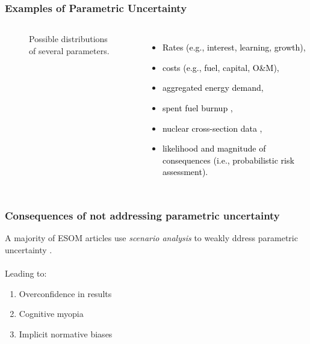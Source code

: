 \begin{frame}
    \frametitle{Examples of Parametric Uncertainty}

    \begin{columns}
        \column[t]{5cm}
        \begin{figure}
            \centering
            \resizebox{\columnwidth}{!}{
                
            }
            \caption{Possible distributions of several parameters.}
            \label{fig:multi-distributions}
        \end{figure}

        \column[t]{5cm}

        \begin{itemize}
            \item \textcolor{black}{Rates (e.g., interest, learning, growth),}
            \item \textcolor{black}{costs (e.g., fuel, capital, O\&M),}
            \item \textcolor{black}{aggregated energy demand,}
            \item \textcolor{black}{spent fuel burnup
            \cite{feng_sensitivity_2020},}
            \item \textcolor{black}{nuclear cross-section data
            \cite{eades_influence_2016,radaideh_combining_2019},}
            \item \textcolor{black}{likelihood and magnitude of consequences
            (i.e., probabilistic risk assessment).}
        \end{itemize}

    \end{columns}

\end{frame}

\begin{frame}
    \frametitle{Consequences of not addressing parametric uncertainty}

    A majority of ESOM articles use \textit{scenario analysis} to weakly ddress
    parametric uncertainty \cite{yue_review_2018}. \\~\\

    Leading to: 
    \begin{enumerate}
        \item Overconfidence in results
        \item Cognitive myopia
        \item Implicit normative biases
    \end{enumerate}


\end{frame}

